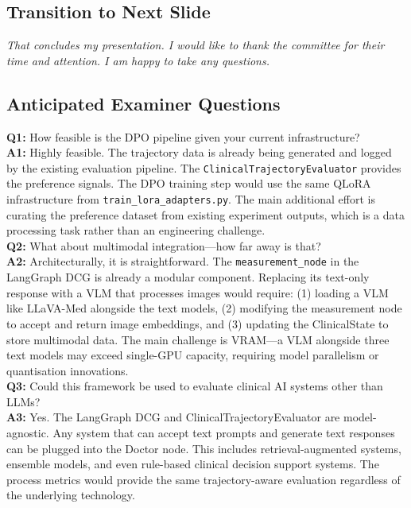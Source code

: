 \documentclass[12pt]{article}
\begin{document}
  \subsection*{Transition to Next Slide}
  {\color{transgreen}
  \textit{That concludes my presentation. I would like to thank the committee for their time and attention. I am happy to take any questions.}
  }

  \subsection*{Anticipated Examiner Questions}
  \begin{qabox}
  \textbf{Q1:} How feasible is the DPO pipeline given your current infrastructure? \\
  \textbf{A1:} Highly feasible. The trajectory data is already being generated and logged by the existing evaluation pipeline. The \texttt{ClinicalTrajectoryEvaluator} provides the preference signals. The DPO training step would use the same QLoRA infrastructure from \texttt{train\_lora\_adapters.py}. The main additional effort is curating the preference dataset from existing experiment outputs, which is a data processing task rather than an engineering challenge. \\[6pt]
  \textbf{Q2:} What about multimodal integration---how far away is that? \\
  \textbf{A2:} Architecturally, it is straightforward. The \texttt{measurement\_node} in the LangGraph DCG is already a modular component. Replacing its text-only response with a VLM that processes images would require: (1) loading a VLM like LLaVA-Med alongside the text models, (2) modifying the measurement node to accept and return image embeddings, and (3) updating the ClinicalState to store multimodal data. The main challenge is VRAM---a VLM alongside three text models may exceed single-GPU capacity, requiring model parallelism or quantisation innovations. \\[6pt]
  \textbf{Q3:} Could this framework be used to evaluate clinical AI systems other than LLMs? \\
  \textbf{A3:} Yes. The LangGraph DCG and ClinicalTrajectoryEvaluator are model-agnostic. Any system that can accept text prompts and generate text responses can be plugged into the Doctor node. This includes retrieval-augmented systems, ensemble models, and even rule-based clinical decision support systems. The process metrics would provide the same trajectory-aware evaluation regardless of the underlying technology.
  \end{qabox}


  
\end{document}
